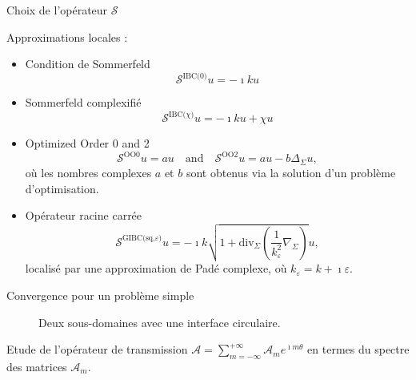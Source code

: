 \documentclass[
mode=present,    %
paper=a4paper,   %
orient=landscape,
display=slides,   %
size=10pt,
style=romain   %
]{powerdot}
\begin{document}
\begin{slide}[toc=]{Choix de l'opérateur $\mathcal{S}$}

Approximations locales :

\begin{itemize}
\item Condition de Sommerfeld %
\begin{equation}\label{S0}
\mathcal{S}^{\text{IBC(0)}} u =-\imath k u
\end{equation}
\item Sommerfeld complexifié %
\begin{equation}\label{S0}
\mathcal{S}^{\text{IBC($\chi$)}} u =-\imath k u + \chi u
\end{equation}
\item Optimized Order 0 and 2 %
\begin{equation}\label{OO}
 \mathcal{S}^\text{OO0}u= a u \quad\text{and}\quad
 \mathcal{S}^\text{OO2}u= a u - b \Delta_\Sigma u,
\end{equation}
où les nombres complexes $a$ et $b$ sont obtenus via la solution d'un
problème d'optimisation.
\item Opérateur racine carrée %
\begin{equation}  \label{sqroot}
  \mathcal{S}^{\text{GIBC(sq,$\varepsilon$)}} u = -
  \imath k\sqrt{1+\textrm{div}_\Sigma\left(\frac{1}{k_{\varepsilon}^{2}}\nabla_\Sigma\right)}u ,
\end{equation}
localisé par une approximation de Padé complexe, où $k_{\varepsilon}=k+\imath  \varepsilon$.
\end{itemize}

\end{slide}

\begin{slide}[toc=Convergence]{Convergence pour un problème simple}

\begin{figure}
\begin{center}
\scalebox{0.6}{}
\caption{Deux sous-domaines avec une interface circulaire.}\label{modelpb}
\end{center}
\end{figure}

Etude de l'opérateur de transmission $\mathcal{A}=\sum_{m=-\infty}^{+\infty} \mathcal{A}_{m}
e^{\imath m\theta}$ en termes du spectre des matrices ${\mathcal A}_m$.

\end{slide}
\end{document}
